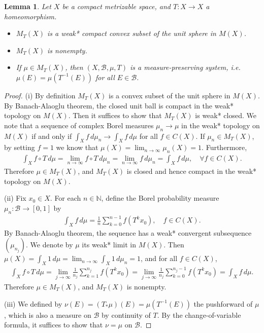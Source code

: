 \documentclass{article}
\numberwithin{equation}{section}
\newcommand{\bbN}{\mathbb{N}}
\newcommand{\scr}{\mathscr}
\theoremstyle{plain}
\newtheorem{lemma}[theorem]{Lemma}
\theoremstyle{definition}
\begin{document}
\begin{lemma}\label{invariantspace}
Let $X$ be a compact metrizable space, and $T:X\to X$ a homeomorphism.
\begin{itemize}
	\item[(i)] $M_T(X)$ is a weak* compact convex subset of the unit sphere in $M(X)$.
	\item[(ii)] $M_T(X)$ is nonempty.
	\item[(iii)] If $\mu\in M_T(X)$, then $(X,\scr{B},\mu, T)$ is a measure-preserving system, i.e. $\mu(E)=\mu(T^{-1}(E))$ for all $E\in\scr{B}$.
\end{itemize}
\end{lemma}
\begin{proof}
(i) By definition $M_T(X)$ is a convex subset of the unit sphere in $M(X)$. By Banach-Alaoglu theorem, the closed unit ball is compact in the weak* topology on $M(X)$. Then it suffices to show that $M_T(X)$ is weak* closed. We note that a sequence of complex Borel measures $\mu_n\to\mu$ in the weak* topology on $M(X)$ if and only if $\int_X f\,d\mu_n\to\int_X f\,d\mu$ for all $f\in C(X)$. If $\mu_n\in M_T(X)$, by setting $f=1$ we know that $\mu(X)=\lim_{n\to\infty}\mu_n(X)=1$. Furthermore,
\begin{align*}
	\int_X f\circ T\,d\mu=\lim_{n\to\infty} f\circ T\,d\mu_n=\lim_{n\to\infty} f\,d\mu_n=\int_X f\,d\mu,\quad\forall f\in C(X).
\end{align*}
Therefore $\mu\in M_T(X)$, and $M_T(X)$ is closed and hence compact in the weak* topology on $M(X)$.

\item (ii) Fix $x_0\in X$. For each $n\in\bbN$, define the Borel probability measure $\mu_n:\scr{B}\to[0,1]$ by
\begin{align*}
	\int_X f\,d\mu=\frac{1}{n}\sum_{k=0}^{n-1} f(T^kx_0),\quad f\in C(X).
\end{align*}
By Banach-Alaoglu theorem, the sequence has a weak* convergent subsequence $(\mu_{n_j})$. We denote by $\mu$ its weak* limit in $M(X)$. Then $\mu(X)=\int_X 1\,d\mu=\lim_{n\to\infty}\int_X1\,d\mu_n=1$, and for all $f\in C(X)$,
\begin{align*}
	\int_X f\circ T\,d\mu=\lim_{j\to\infty}\frac{1}{n_j}\sum_{k=1}^{n_j}f(T^kx_0)=\lim_{j\to\infty}\frac{1}{n_j}\sum_{k=0}^{n_j-1}f(T^kx_0)=\int_X f\,d\mu.
\end{align*}
Therefore $\mu\in M_T(X)$, and $M_T(X)$ is nonempty.

\item (iii) We defined by $\nu(E)=(T_*\mu)(E)=\mu(T^{-1}(E))$ the pushforward of $\mu$, which is also a measure on $\scr{B}$ by continuity of $T$. By the change-of-variable formula, it suffices to show that $\nu=\mu$ on $\scr{B}$.


\end{proof}
\end{document}
